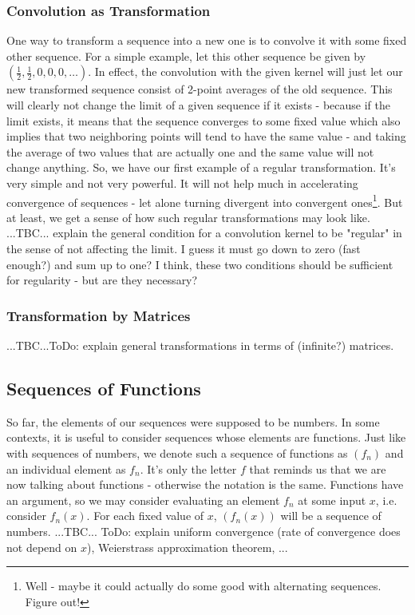 \subsubsection{Convolution as Transformation}
One way to transform a sequence into a new one is to convolve it with some fixed other sequence. For a simple example, let this other sequence be given by $(\frac{1}{2}, \frac{1}{2}, 0, 0, 0, \ldots)$. In effect, the convolution with the given kernel will just let our new transformed sequence consist of 2-point averages of the old sequence. This will clearly not change the limit of a given sequence if it exists - because if the limit exists, it means that the sequence converges to some fixed value which also implies that two neighboring points will tend to have the same value - and taking the average of two values that are actually one and the same value will not change anything. So, we have our first example of a regular transformation. It's very simple and not very powerful. It will not help much in accelerating convergence of sequences - let alone turning divergent into convergent ones\footnote{Well - maybe it could actually do some good with alternating sequences. Figure out!}. But at least, we get a sense of how such regular transformations may look like. ...TBC... explain the general condition for a convolution kernel to be "regular" in the sense of not affecting the limit. I guess it must go down to zero (fast enough?) and sum up to one? I think, these two conditions should be sufficient for regularity - but are they necessary? 

\subsubsection{Transformation by Matrices} ...TBC...ToDo: explain general transformations in terms of (infinite?) matrices.



\subsection{Sequences of Functions} So far, the elements of our sequences were supposed to be numbers. In some contexts, it is useful to consider sequences whose elements are functions. Just like with sequences of numbers, we denote such a sequence of functions as $(f_n)$ and an individual element as $f_n$. It's only the letter $f$ that reminds us that we are now talking about functions - otherwise the notation is the same. Functions have an argument, so we may consider evaluating an element $f_n$ at some input $x$, i.e. consider $f_n(x)$. For each fixed value of $x$, $(f_n(x))$ will be a sequence of numbers. ...TBC... ToDo: explain uniform convergence (rate of convergence does not depend on $x$), Weierstrass approximation theorem, ...

